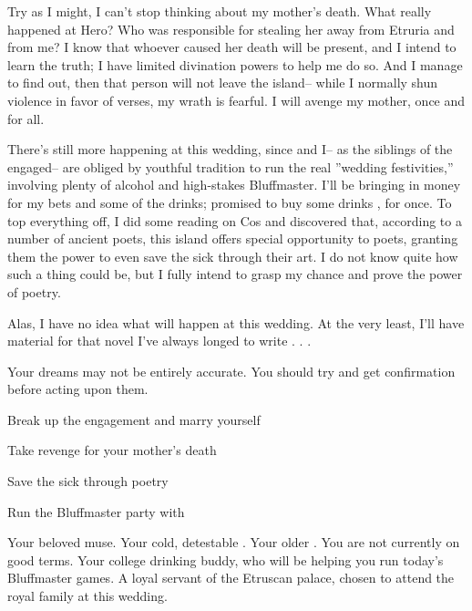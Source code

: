 \documentclass[char]{Kos}
\begin{document}
Try as I might, I can't stop thinking about my mother's death. What really happened at Hero? Who was responsible for stealing her away from Etruria and from me? I know that whoever caused her death will be present, and I intend to learn the truth; I have limited divination powers to help me do so. And I manage to find out, then that person will not leave the island-- while I normally shun violence in favor of verses, my wrath is fearful. I will avenge my mother, once and for all.

There's still more happening at this wedding, since \cWard{} and I-- as the siblings of the engaged-- are obliged by youthful tradition to run the real ''wedding festivities,'' involving plenty of alcohol and high-stakes Bluffmaster. I'll be bringing in money for my bets and some of the drinks; \cWard{} promised to buy some drinks \cWard{\themself}, for once. To top everything off, I did some reading on Cos and discovered that, according to a number of ancient poets, this island offers special opportunity to poets, granting them the power to even save the sick through their art. I do not know quite how such a thing could be, but I fully intend to grasp my chance and prove the power of poetry.

Alas, I have no idea what will happen at this wedding. At the very least, I'll have material for that novel I've always longed to write . . . 

\begin{itemz}[Notes]
  \item Your dreams may not be entirely accurate. You should try and get confirmation before acting upon them.
\end{itemz}

\begin{itemz}[Goals]
\item Break up the engagement and marry \cBride{} yourself
\item Take revenge for your mother's death
\item Save the sick through poetry
\item Run the Bluffmaster party with \cWard{}
\end{itemz}


\begin{contacts}
\contact{\cBride{}} Your beloved muse.
\contact{\cEtruriaKing{}} Your cold, detestable \cEtruriaKing{\parent}.
\contact{\cGroom{}} Your older \cBrother{\sibling}. You are not currently on good terms.
\contact{\cWard{}} Your college drinking buddy, who will be helping you run today's Bluffmaster games.
\contact{\cAssassin{}} A loyal servant of the Etruscan palace, chosen to attend the royal family at this wedding.
\end{contacts} 
\end{document}
